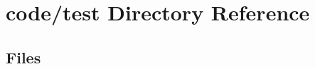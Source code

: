 \section{code/test Directory Reference}
\label{dir_66ecc99f153c06fbe81feb5e867c9e93}
\subsection*{Files}
\begin{DoxyCompactItemize}
\end{DoxyCompactItemize}
